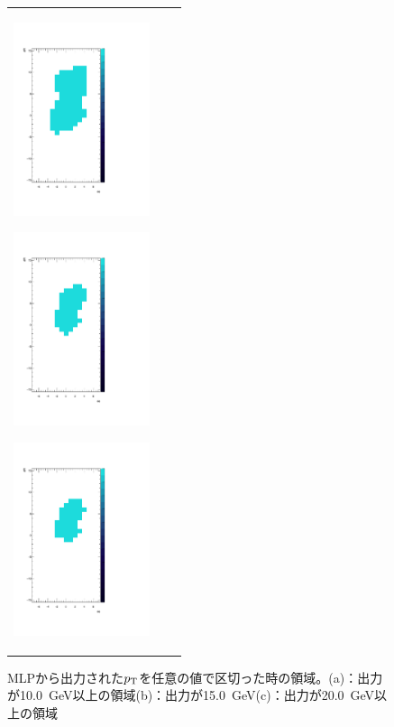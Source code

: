 \begin{figure}
    \begin{tabular}{ccc}
    \centering
    \begin{minipage}[b]{0.33\hsize}%
        \centering
        \includegraphics[clip, width=4cm]{fig/4/cut1_output.pdf}
        \subcaption{}
        \label{cut1}
    \end{minipage}%
    \begin{minipage}[b]{0.33\hsize}%
        \centering
        \includegraphics[clip, width=4cm]{fig/4/cut2_output.pdf}
        \subcaption{}
        \label{cut2}
    \end{minipage}%
    \begin{minipage}[b]{0.33\hsize}%
        \centering
        \includegraphics[clip, width=4cm]{fig/4/cut3_output.pdf}
        \subcaption{}
        \label{cut3}
    \end{minipage}%
    \end{tabular}
    \caption{MLPから出力された$p_{\rm{T}}$を任意の値で区切った時の領域。(a)：出力が10.0~GeV以上の領域(b)：出力が15.0~GeV(c)：出力が20.0~GeV以上の領域}
    \label{ninninoCut}
\end{figure}


